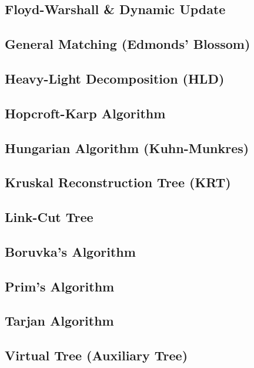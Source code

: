 \subsection{Floyd-Warshall \& Dynamic Update}

\subsection{General Matching (Edmonds' Blossom)}

\subsection{Heavy-Light Decomposition (HLD)}

\subsection{Hopcroft-Karp Algorithm}

\subsection{Hungarian Algorithm (Kuhn-Munkres)}

\subsection{Kruskal Reconstruction Tree (KRT)}

\subsection{Link-Cut Tree}

\subsection{Boruvka's Algorithm}

\subsection{Prim's Algorithm}

\subsection{Tarjan Algorithm}

\subsection{Virtual Tree (Auxiliary Tree)}


